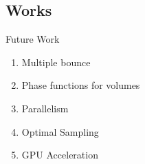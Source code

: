 \documentclass[10pt,compress,professionalfont]{beamer}
\begin{document}
\subsection{Works}
\begin{frame}{Future Work}

    \begin{enumerate}
        \item Multiple bounce
        \item Phase functions for volumes
        \item Parallelism
        \item Optimal Sampling
        \item GPU Acceleration
    \end{enumerate}

\end{frame}
\end{document}
